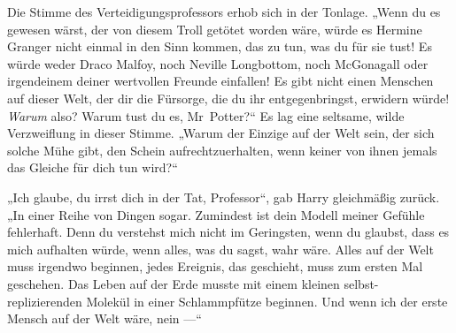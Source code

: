 Die Stimme des Verteidigungsprofessors erhob sich in der Tonlage.
„Wenn du es gewesen wärst, der von diesem Troll getötet worden wäre, würde es Hermine Granger nicht einmal in den Sinn kommen, das zu tun, was du für sie tust! Es würde weder Draco Malfoy, noch Neville Longbottom, noch McGonagall oder irgendeinem deiner wertvollen Freunde einfallen! Es gibt nicht einen Menschen auf dieser Welt, der dir die Fürsorge, die du ihr entgegenbringst, erwidern würde! \emph{Warum} also? Warum tust du es, Mr~Potter?“ Es lag eine seltsame, wilde Verzweiflung in dieser Stimme.
„Warum der Einzige auf der Welt sein, der sich solche Mühe gibt, den Schein aufrechtzuerhalten, wenn keiner von ihnen jemals das Gleiche für dich tun wird?“

„Ich glaube, du irrst dich in der Tat, Professor“, gab Harry gleichmäßig zurück.
„In einer Reihe von Dingen sogar. Zumindest ist dein Modell meiner Gefühle fehlerhaft. Denn du verstehst mich nicht im Geringsten, wenn du glaubst, dass es mich aufhalten würde, wenn alles, was du sagst, wahr wäre. Alles auf der Welt muss irgendwo beginnen, jedes Ereignis, das geschieht, muss zum ersten Mal geschehen. Das Leben auf der Erde musste mit einem kleinen selbst-replizierenden Molekül in einer Schlammpfütze beginnen. Und wenn ich der erste Mensch auf der Welt wäre, nein —“


